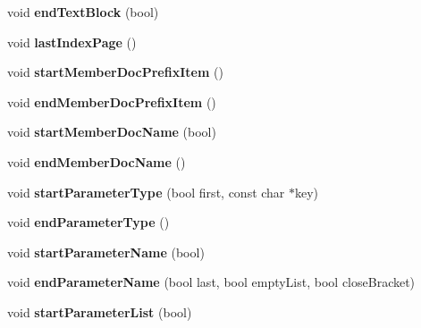 \begin{DoxyCompactItemize}
void {\bfseries end\+Text\+Block} (bool)
\item 
\mbox{\label{class_html_generator_a91b2b5d349350e74a92c1c51ff9eec8f}} 
void {\bfseries last\+Index\+Page} ()
\item 
\mbox{\label{class_html_generator_aafaa04b511a0cf5281d58f7700bf0c09}} 
void {\bfseries start\+Member\+Doc\+Prefix\+Item} ()
\item 
\mbox{\label{class_html_generator_a0cacf6a5a55ada9f6f8688e06ce831b7}} 
void {\bfseries end\+Member\+Doc\+Prefix\+Item} ()
\item 
\mbox{\label{class_html_generator_a9067c50404d75e969e8463bc4dbb98a5}} 
void {\bfseries start\+Member\+Doc\+Name} (bool)
\item 
\mbox{\label{class_html_generator_a4b86a0067f27e69bbfedd0d97e6eb3d9}} 
void {\bfseries end\+Member\+Doc\+Name} ()
\item 
\mbox{\label{class_html_generator_abff728b4734da738d2e0deb552efce08}} 
void {\bfseries start\+Parameter\+Type} (bool first, const char $\ast$key)
\item 
\mbox{\label{class_html_generator_a7acf2aede403e63af3a43d412894a480}} 
void {\bfseries end\+Parameter\+Type} ()
\item 
\mbox{\label{class_html_generator_a8da2ad5820039d49072240e3e1bdd582}} 
void {\bfseries start\+Parameter\+Name} (bool)
\item 
\mbox{\label{class_html_generator_abd64a3a25b75672c9944ec32d014f55a}} 
void {\bfseries end\+Parameter\+Name} (bool last, bool empty\+List, bool close\+Bracket)
\item 
\mbox{\label{class_html_generator_aaec3b60d1bf3226721458402a321c9fe}} 
void {\bfseries start\+Parameter\+List} (bool)
\item 
\mbox{\label{class_html_generator_a09ba0b9e2623bb31767342f4a8834451}} 

\end{DoxyCompactItemize}

